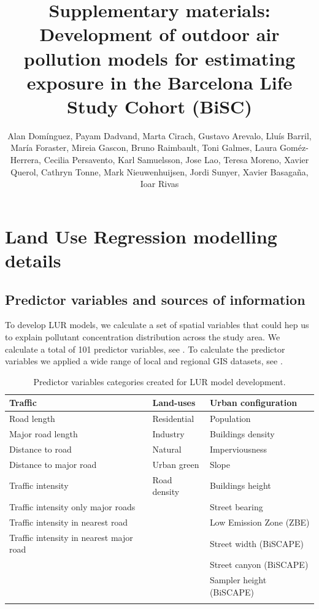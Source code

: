 \documentclass{article}
\title{\textbf{\Large Supplementary materials: Development of outdoor air pollution models for estimating exposure in the Barcelona Life Study Cohort (BiSC)}}
\author{\small Alan Domínguez, Payam Dadvand, Marta Cirach, Gustavo Arevalo, 
Lluís Barril, María Foraster, Mireia Gascon, Bruno Raimbault, Toni Galmes, Laura Goméz-Herrera, Cecilia Persavento, Karl Samuelsson, Jose Lao, Teresa Moreno, Xavier Querol,
Cathryn Tonne, Mark Nieuwenhuijsen, Jordi Sunyer, Xavier Basagaña, Ioar Rivas}
\date{}
\begin{document}
\maketitle

\vspace*{-1cm}

\section{Land Use Regression modelling details}

\subsection{Predictor variables and sources of information}
To develop LUR models, we calculate a set of spatial variables that could hep us to explain pollutant concentration distribution across the study area. We calculate a total of 101 predictor variables, see \textbf{}. To calculate the predictor variables we applied a wide range of local and regional GIS datasets, see \textbf{}. 


\renewcommand{\thetable}{S\arabic{table}}
\begin{table}[ht]
\centering
\caption{Predictor variables categories created for LUR model development.}
\begin{tabular}{lll}
\toprule
\textbf{Traffic} & \textbf{Land-uses} & \textbf{Urban configuration} \\
\midrule
Road length & Residential & Population \\
Major road length & Industry & Buildings density \\
Distance to road & Natural & Imperviousness \\
Distance to major road & Urban green & Slope \\
Traffic intensity & Road density & Buildings height \\
Traffic intensity only major roads &  & Street bearing \\
Traffic intensity in nearest road &  & Low Emission Zone (ZBE)\\
Traffic intensity in nearest major road &  & Street width (BiSCAPE)\\
                                         &  & Street canyon (BiSCAPE)\\
                                         &  & Sampler height (BiSCAPE)\\
\bottomrule
\label{Table S1}
\end{tabular}
\end{table}
\end{document}

